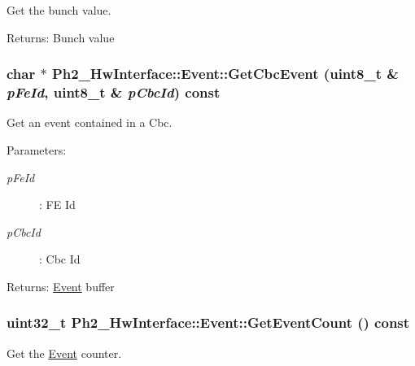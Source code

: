 Get the bunch value. 

\begin{Desc}
\item[Returns:]Bunch value \end{Desc}
\hypertarget{class_ph2___hw_interface_1_1_event_2ee5e2552a84cb78ae902436e0dd77f4}{
\subsubsection[GetCbcEvent]{\setlength{\rightskip}{0pt plus 5cm}char $\ast$ Ph2\_\-Hw\-Interface::Event::Get\-Cbc\-Event (uint8\_\-t \& {\em p\-Fe\-Id}, uint8\_\-t \& {\em p\-Cbc\-Id}) const}}
\label{class_ph2___hw_interface_1_1_event_2ee5e2552a84cb78ae902436e0dd77f4}


Get an event contained in a Cbc. 

\begin{Desc}
\item[Parameters:]
\begin{description}
\item[{\em p\-Fe\-Id}]: FE Id \item[{\em p\-Cbc\-Id}]: Cbc Id \end{description}
\end{Desc}
\begin{Desc}
\item[Returns:]\hyperlink{class_ph2___hw_interface_1_1_event}{Event} buffer \end{Desc}
\hypertarget{class_ph2___hw_interface_1_1_event_aebf08f816e8a98f424ba8ab25e32231}{
\subsubsection[GetEventCount]{\setlength{\rightskip}{0pt plus 5cm}uint32\_\-t Ph2\_\-Hw\-Interface::Event::Get\-Event\-Count () const}}
\label{class_ph2___hw_interface_1_1_event_aebf08f816e8a98f424ba8ab25e32231}


Get the \hyperlink{class_ph2___hw_interface_1_1_event}{Event} counter. 

